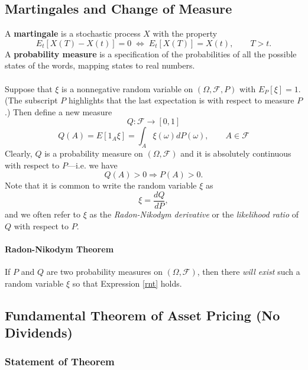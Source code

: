 \documentclass[12pt]{article}
\theoremstyle{plain}
\theoremstyle{definition}
\theoremstyle{remark}
\begin{document}
\subsection{Martingales and Change of Measure}

A \textbf{martingale} is a stochastic process
$X$ with the property 
   \[ E_t[X(T) - X(t)] = 0 \; \Leftrightarrow \; E_t[X(T)] = X(t), \qquad
      T > t. \]
A \textbf{probability measure} is a specification
of the probabilities of all the possible states of the words, mapping
states to real numbers.
\\
\\
Suppose that $\xi$ is a nonnegative random variable on $(\Omega,
\mathcal{F}, P)$ with $E_P[\xi] = 1$. (The subscript $P$ highlights that
the last expectation is with respect to measure $P$.) 
Then define a new measure
   \[ Q: \mathcal{F} \rightarrow [0,1] \]
\begin{equation}
   \label{rnt}
   Q(A) = E\left[1_A \xi\right]=\int_A\xi(\omega) dP(\omega), \qquad
      A\in \mathcal{F} 
\end{equation}
Clearly, $Q$ is a probability measure on $(\Omega, \mathcal{F})$ and
it is absolutely continuous with respect to $P$---i.e. we have
   \[Q(A) > 0 \Rightarrow P(A) > 0.\] 
Note that it is common to write the random variable $\xi$ as
   \[ \xi = \frac{dQ}{dP},\]
and we often refer to $\xi$ as the \emph{Radon-Nikodym derivative}
or the \emph{likelihood ratio} of $Q$ with respect to $P$.

\paragraph{Radon-Nikodym Theorem} If $P$ and $Q$ are two probability
measures on $(\Omega, \mathcal{F})$, then there \emph{will exist}
such a random variable $\xi$ so that Expression \ref{rnt} holds.


\newpage
\subsection{Fundamental Theorem of Asset Pricing (No Dividends)}

\subsubsection{Statement of Theorem}
\end{document}
